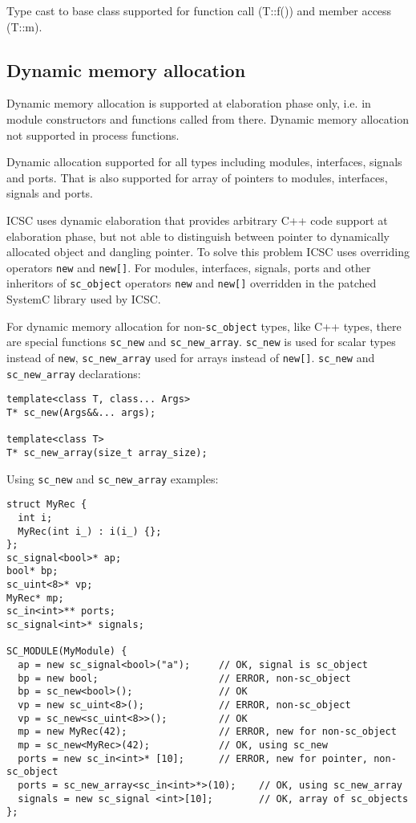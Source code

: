 Type cast to base class supported for function call (T::f()) and member access (T::m).


\subsection{Dynamic memory allocation}

Dynamic memory allocation is supported at elaboration phase only, i.e. in module constructors and functions called from there. Dynamic memory allocation not supported in process functions.

Dynamic allocation supported for all types including modules, interfaces, signals and ports. That is also supported for array of pointers to modules, interfaces, signals and ports.

ICSC uses dynamic elaboration that provides arbitrary C++ code support at elaboration phase, but not able to distinguish between pointer to dynamically allocated object and dangling pointer. To solve this problem ICSC uses overriding operators {\tt new} and {\tt new[]}. For modules, interfaces, signals, ports and other inheritors of {\tt sc\_object} operators {\tt new} and {\tt new[]} overridden in the patched SystemC library used by ICSC. 

For dynamic memory allocation for non-{\tt sc\_object} types, like C++ types, there are special functions {\tt sc\_new} and {\tt sc\_new\_array}. {\tt sc\_new} is used for scalar types instead of {\tt new}, {\tt sc\_new\_array} used for arrays instead of {\tt new[]}. {\tt sc\_new} and {\tt sc\_new\_array} declarations:
%
\begin{lstlisting}[style=mycpp]
template<class T, class... Args>
T* sc_new(Args&&... args);
 
template<class T>
T* sc_new_array(size_t array_size);
\end{lstlisting}

Using {\tt sc\_new} and {\tt sc\_new\_array} examples:
% 
\begin{lstlisting}[style=mycpp]
struct MyRec {
  int i;
  MyRec(int i_) : i(i_) {};
};
sc_signal<bool>* ap;
bool* bp;
sc_uint<8>* vp;
MyRec* mp;
sc_in<int>** ports;
sc_signal<int>* signals;
   
SC_MODULE(MyModule) {
  ap = new sc_signal<bool>("a");     // OK, signal is sc_object
  bp = new bool;                     // ERROR, non-sc_object
  bp = sc_new<bool>();               // OK
  vp = new sc_uint<8>();             // ERROR, non-sc_object
  vp = sc_new<sc_uint<8>>();         // OK
  mp = new MyRec(42);                // ERROR, new for non-sc_object
  mp = sc_new<MyRec>(42);            // OK, using sc_new
  ports = new sc_in<int>* [10];      // ERROR, new for pointer, non-sc_object 
  ports = sc_new_array<sc_in<int>*>(10);    // OK, using sc_new_array
  signals = new sc_signal <int>[10];        // OK, array of sc_objects 
};
\end{lstlisting}


